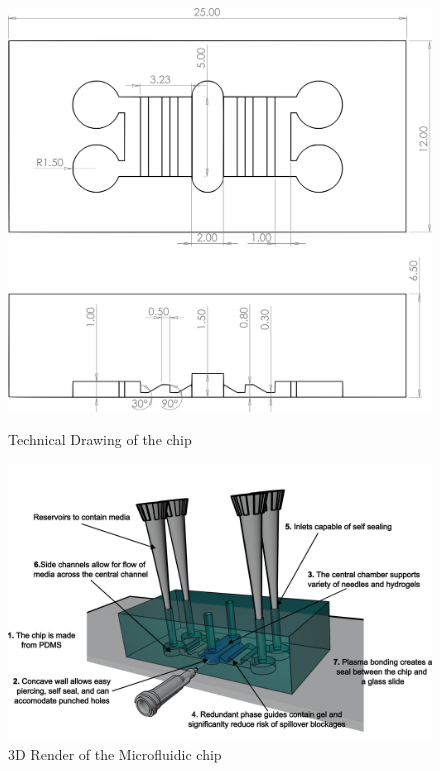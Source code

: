 \documentclass[letterpaper,12pt]{article}
\begin{document}
\begin{figure}[h!]
    \begin{minipage}[b]{0.33\textwidth}
        \centering
        \includegraphics[width=\textwidth]{figures/Chip_technical_drawing.png}
        \caption{Technical Drawing of the chip}\label{fig:tech_draw_chip_final}
    \end{minipage}
    \hfill
    \begin{minipage}[b]{0.6
    \textwidth}
        \centering
        \includegraphics[width=\textwidth]{figures/annotated_features.png}
        \caption{3D Render of the Microfluidic chip}\label{fig:3d_render_microchip}
    \end{minipage}
\end{figure}
\end{document}
